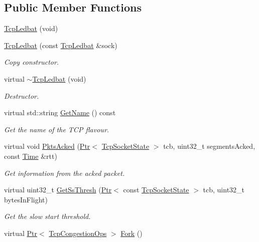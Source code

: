\subsection*{Public Member Functions}
\begin{DoxyCompactItemize}
\item 
\hyperlink{classns3_1_1TcpLedbat_a8ce24fa585b0a39bd74faec66d6ae3d8}{Tcp\+Ledbat} (void)
\item 
\hyperlink{classns3_1_1TcpLedbat_ab3698a5f05e1d0d8e7b7272d84b9ac50}{Tcp\+Ledbat} (const \hyperlink{classns3_1_1TcpLedbat}{Tcp\+Ledbat} \&sock)
\begin{DoxyCompactList}\small\item\em Copy constructor. \end{DoxyCompactList}\item 
virtual \hyperlink{classns3_1_1TcpLedbat_acc17bdda2a04514dff34706b18692d1b}{$\sim$\+Tcp\+Ledbat} (void)
\begin{DoxyCompactList}\small\item\em Destructor. \end{DoxyCompactList}\item 
virtual std\+::string \hyperlink{classns3_1_1TcpLedbat_af3706fd2c991966e5a4e7f97e799395a}{Get\+Name} () const 
\begin{DoxyCompactList}\small\item\em Get the name of the T\+CP flavour. \end{DoxyCompactList}\item 
virtual void \hyperlink{classns3_1_1TcpLedbat_adc44a91826f2080c5551a313648d3848}{Pkts\+Acked} (\hyperlink{classns3_1_1Ptr}{Ptr}$<$ \hyperlink{classns3_1_1TcpSocketState}{Tcp\+Socket\+State} $>$ tcb, uint32\+\_\+t segments\+Acked, const \hyperlink{classns3_1_1Time}{Time} \&rtt)
\begin{DoxyCompactList}\small\item\em Get information from the acked packet. \end{DoxyCompactList}\item 
virtual uint32\+\_\+t \hyperlink{classns3_1_1TcpLedbat_a8d228eff64ff4a9d8d64e939ee19d016}{Get\+Ss\+Thresh} (\hyperlink{classns3_1_1Ptr}{Ptr}$<$ const \hyperlink{classns3_1_1TcpSocketState}{Tcp\+Socket\+State} $>$ tcb, uint32\+\_\+t bytes\+In\+Flight)
\begin{DoxyCompactList}\small\item\em Get the slow start threshold. \end{DoxyCompactList}\item 
virtual \hyperlink{classns3_1_1Ptr}{Ptr}$<$ \hyperlink{classns3_1_1TcpCongestionOps}{Tcp\+Congestion\+Ops} $>$ \hyperlink{classns3_1_1TcpLedbat_a76866fc3f6e142e996465e2c987e2629}{Fork} ()

\end{DoxyCompactItemize}
